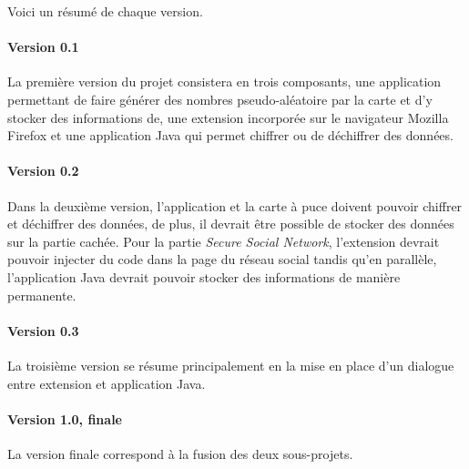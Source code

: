 \documentclass[a4paper,11pt,french]{article}
\begin{document}
Voici un résumé de chaque version.

\paragraph{Version 0.1} 
La première version du projet consistera en trois composants, une application
permettant de faire générer des nombres pseudo-aléatoire par la
carte et d'y stocker des informations de, une extension incorporée sur 
le navigateur Mozilla Firefox et une application Java qui permet chiffrer 
ou de déchiffrer des données.

\paragraph{Version 0.2}  
Dans la deuxième version, l'application et la carte à puce doivent pouvoir
chiffrer et déchiffrer des données, de plus, il devrait être possible
de stocker des données sur la partie cachée. Pour la partie 
\emph{Secure Social Network}, l'extension devrait pouvoir injecter
du code dans la page du réseau social tandis qu'en parallèle, l'application
Java devrait pouvoir stocker des informations de manière permanente.

\paragraph{Version 0.3}
La troisième version se résume principalement en la mise en place
d'un dialogue entre extension et application Java.

\paragraph{Version 1.0, finale} 
La version finale correspond à la fusion des deux sous-projets.
\end{document}
